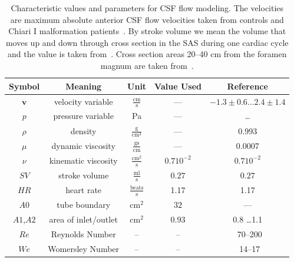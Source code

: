 \begin{table}
\begin{center}
    \begin{tabular}{ | c | c | c | c | c | }
    \hline
    Symbol & Meaning & Unit & Value Used & Reference \\ \hline\hline
	$\mathbf{v}$	& velocity variable & $\mathrm{ \frac{cm}{s}}$ & --- & $-1.3\pm 0.6 \ldots 2.4 \pm 1.4$  \\
	$p$		& pressure	variable & Pa & --- & \ldots\\
	$\rho$	& density & $\mathrm{\frac{g}{cm^3}}$ & --- &0.993 \\ %
	$\mu$	& dynamic viscosity	&  $\mathrm{\frac{g s}{cm}}$ & --- & 0.0007\\
	$\nu$	& kinematic viscosity & $\mathrm{ \frac{cm^2}{s}}$ & $0.7 10^{-2}$ & $0.7 10^{-2}$ \\ 	\hline %
	$SV$	& stroke volume 	& $\mathrm{ \frac{ml}{s}}$& $0.27$  & $0.27$ \\
	$HR$	& heart rate & $\mathrm{\frac{beats}{s}}$	& 1.17 & 1.17\\
	$A0$	& tube boundary	& $\mathrm{ cm^2}$ & $32$  & ---\\
	$A1$,$A2$	& area of inlet/outlet & $\mathrm{ cm^2}$ &$0.93$ & 0.8 \ldots 1.1   \\
    \hline
    $Re$    & Reynolds Number & -- & -- & ~70--200 \\
    $We$    & Womersley Number & -- & -- & ~14--17 \\
    \hline
    \end{tabular}
	\label{tab:entities}
\vspace{1cm}
\caption{
Characteristic values and parameters for CSF flow modeling.
The velocities are maximum absolute anterior CSF flow velocities  taken from controls 
and Chiari I malformation patients~\cite{HofmannWarmuth-MetzBendszusEtAl2000}.
By stroke volume we mean the volume that moves up and down through cross section in 
the SAS during one cardiac cycle and the value is taken from~\cite{GuptaSoellingerBoesigerEtAl2009}.
Cross section areas  20--40 cm from the foramen magnum are taken from~\cite{LothYardimciAlperin2001}.
}
\end{center}
\end{table}

\vspace{6cm}

